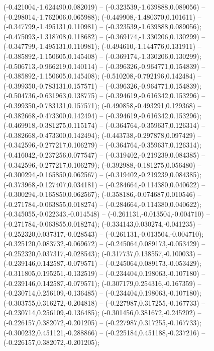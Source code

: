  (-0.421004,-1.624490,0.082019) -- (-0.323539,-1.639888,0.089056) -- (-0.298014,-1.762006,0.065988);
 (-0.449908,-1.480370,0.101611) -- (-0.347799,-1.495131,0.110981) -- (-0.323539,-1.639888,0.089056);
 (-0.475093,-1.318708,0.118682) -- (-0.369174,-1.330206,0.130299) -- (-0.347799,-1.495131,0.110981);
 (-0.494610,-1.144776,0.131911) -- (-0.385892,-1.150605,0.145408) -- (-0.369174,-1.330206,0.130299);
 (-0.506713,-0.966219,0.140114) -- (-0.396326,-0.964771,0.154839) -- (-0.385892,-1.150605,0.145408);
 (-0.510208,-0.792196,0.142484) -- (-0.399350,-0.783131,0.157571) -- (-0.396326,-0.964771,0.154839);
 (-0.504736,-0.631963,0.138775) -- (-0.394619,-0.616342,0.153296) -- (-0.399350,-0.783131,0.157571);
 (-0.490858,-0.493291,0.129368) -- (-0.382668,-0.473300,0.142494) -- (-0.394619,-0.616342,0.153296);
 (-0.469918,-0.381275,0.115174) -- (-0.364764,-0.359637,0.126314) -- (-0.382668,-0.473300,0.142494);
 (-0.443738,-0.297878,0.097429) -- (-0.342596,-0.277217,0.106279) -- (-0.364764,-0.359637,0.126314);
 (-0.416042,-0.237256,0.077547) -- (-0.319402,-0.219239,0.084385) -- (-0.342596,-0.277217,0.106279);
 (-0.392988,-0.181275,0.056480) -- (-0.300294,-0.165850,0.062567) -- (-0.319402,-0.219239,0.084385);
 (-0.373968,-0.127407,0.034181) -- (-0.284664,-0.114380,0.040622) -- (-0.300294,-0.165850,0.062567);
 (-0.358186,-0.074687,0.010546) -- (-0.271784,-0.063855,0.018274) -- (-0.284664,-0.114380,0.040622);
 (-0.345055,-0.022343,-0.014548) -- (-0.261131,-0.013504,-0.004710) -- (-0.271784,-0.063855,0.018274);
 (-0.334143,0.030274,-0.041235) -- (-0.252320,0.037317,-0.028543) -- (-0.261131,-0.013504,-0.004710);
 (-0.325120,0.083732,-0.069672) -- (-0.245064,0.089173,-0.053429) -- (-0.252320,0.037317,-0.028543);
 (-0.317737,0.138557,-0.100033) -- (-0.239146,0.142587,-0.079571) -- (-0.245064,0.089173,-0.053429);
 (-0.311805,0.195251,-0.132519) -- (-0.234404,0.198063,-0.107180) -- (-0.239146,0.142587,-0.079571);
 (-0.307179,0.254316,-0.167359) -- (-0.230714,0.256109,-0.136485) -- (-0.234404,0.198063,-0.107180);
 (-0.303755,0.316272,-0.204818) -- (-0.227987,0.317255,-0.167733) -- (-0.230714,0.256109,-0.136485);
 (-0.301456,0.381672,-0.245202) -- (-0.226157,0.382072,-0.201205) -- (-0.227987,0.317255,-0.167733);
 (-0.300232,0.451121,-0.288866) -- (-0.225184,0.451188,-0.237216) -- (-0.226157,0.382072,-0.201205);
